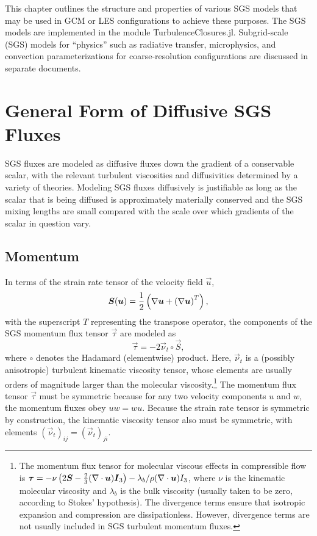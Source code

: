 \documentclass{report}
\begin{document}
This chapter outlines the structure and properties of various SGS models that may be used in GCM or LES configurations to achieve these purposes. The SGS models are implemented in the module TurbulenceClosures.jl. Subgrid-scale (SGS) models for ``physics'' such as radiative transfer, microphysics, and convection parameterizations for coarse-resolution configurations are discussed in  separate documents. 

\section{General Form of Diffusive SGS Fluxes}\label{s:sgs_fluxes_form}

SGS fluxes are modeled as diffusive fluxes down the gradient of a conservable scalar, with the relevant turbulent viscosities and diffusivities determined by a variety of theories. Modeling SGS fluxes diffusively is justifiable as long as the scalar that is being diffused is approximately materially conserved and the SGS mixing lengths are small compared with the scale over which gradients of the scalar in question vary. 

\subsection{Momentum}

In terms of the strain rate tensor of the velocity field $\vec{u}$,
\begin{equation}\label{e:strain_rate}
\boldsymbol{{S}}(\boldsymbol{{u}}) = \frac{1}{2}  \left(\nabla \boldsymbol{{u}} +  \left( \nabla \boldsymbol{{u}} \right)^T \right),
\end{equation}
with the superscript $T$ representing the transpose operator, the components of the SGS momentum flux tensor $\vec{\tau}$ are modeled as
\begin{equation}\label{e:sgs_momentum_flux}
\vec{\tau} =  - 2 \vec{\nu}_t \circ \vec{S},
\end{equation}
where $\circ$ denotes the Hadamard (elementwise) product. Here, $\vec{\nu}_t$ is a (possibly anisotropic) turbulent kinematic viscosity tensor, whose elements are usually orders of magnitude larger than the molecular viscosity.\footnote{The momentum flux tensor for molecular viscous effects in compressible flow is $\boldsymbol{{\tau}}  =  - \nu \left( 2\boldsymbol{{S}}  - \frac{2}{3} (\nabla \cdot \boldsymbol{{u}}) \boldsymbol{{I}}_3 \right) - \lambda_b/\rho (\nabla \cdot \boldsymbol{{u}}) I_3$, where $\nu$ is the kinematic molecular viscosity and $\lambda_b$ is the bulk viscosity (usually taken to be zero, according to Stokes' hypothesis). The divergence terms ensure that isotropic expansion and compression are dissipationless. However, divergence terms are not usually included in SGS turbulent momentum fluxes.} The momentum flux tensor $\vec{\tau}$ must be symmetric because for any two velocity components $u$ and $w$, the momentum fluxes obey $uw = wu$. Because the strain rate tensor is symmetric by construction, the kinematic viscosity tensor also must be symmetric, with elements $(\vec{\nu}_t)_{ij} = (\vec{\nu}_t)_{ji}$.
\end{document}
